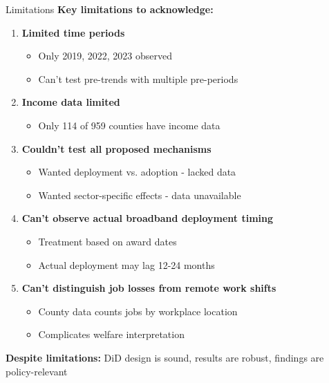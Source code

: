 \documentclass[aspectratio=169]{beamer}
\begin{document}
\begin{frame}{Limitations}
\textbf{Key limitations to acknowledge:}

\begin{enumerate}
    \item \textbf{Limited time periods}
    \begin{itemize}
        \item Only 2019, 2022, 2023 observed
        \item Can't test pre-trends with multiple pre-periods
    \end{itemize}
    
    
    
    \item \textbf{Income data limited}
    \begin{itemize}
        \item Only 114 of 959 counties have income data
    \end{itemize}
    
    
    
    \item \textbf{Couldn't test all proposed mechanisms}
    \begin{itemize}
        \item Wanted deployment vs. adoption - lacked data
        \item Wanted sector-specific effects - data unavailable
    \end{itemize}
    
    
    
    \item \textbf{Can't observe actual broadband deployment timing}
    \begin{itemize}
        \item Treatment based on award dates
        \item Actual deployment may lag 12-24 months
    \end{itemize}
    
    
    
    \item \textbf{Can't distinguish job losses from remote work shifts}
    \begin{itemize}
        \item County data counts jobs by workplace location
        \item Complicates welfare interpretation
    \end{itemize}
\end{enumerate}

\vspace{0.2cm}

\textbf{Despite limitations:} DiD design is sound, results are robust, findings are policy-relevant
\end{frame}
\end{document}
